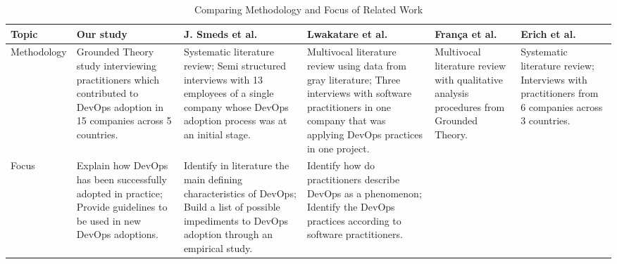\begin{table*}[t]
\centering
\caption{Comparing Methodology and Focus of Related Work}
\label{related_work_table}
\begin{tabular}{|p{1.7cm}|p{2.72cm}|p{2.72cm}|p{2.72cm}|p{2.72cm}|p{2.72cm}|}
\toprule
\textbf{Topic} &
\textbf{Our study} &
\textbf{J. Smeds et al.~\cite{devops_a_definition_xp_15}} &
\textbf{Lwakatare et al.~\cite{extending_dimensions_icsea_16}} &
\textbf{Fran\c{c}a et al.~\cite{characterizing_devops_sbes_2016}} &
\textbf{Erich et al.~\cite{qualitative_devops_journalsw_17}} \\ \midrule

Methodology

&
Grounded Theory study interviewing practitioners which contributed to DevOps
adoption in 15 companies across 5 countries.

&
Systematic literature review;
\newline \newline
Semi structured interviews with 13 employees of a single company whose DevOps
adoption process was at an initial stage.

&
Multivocal literature review using data from gray literature;
\newline \newline
Three interviews with software practitioners in one company that was applying
DevOps practices in one project.

&
Multivocal literature review with qualitative analysis procedures from
Grounded Theory.

&
Systematic literature review;
\newline \newline
Interviews with practitioners from 6 companies across 3 countries.


\\ \midrule

Focus
&
Explain how DevOps has been successfully adopted in practice;
\newline \newline
Provide guidelines to be used in new DevOps adoptions.

&
Identify in literature the main defining characteristics of DevOps;
\newline \newline
Build a list of possible impediments to DevOps adoption through an empirical
study.

&
Identify how do practitioners describe DevOps as a phenomenon;
\newline \newline
Identify the DevOps practices according to software practitioners.


\end{tabular}
\end{table*}

